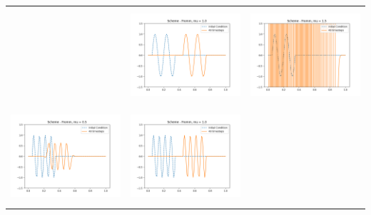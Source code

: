 \documentclass[a4paper,twoside,11pt]{article}
\begin{document}
\begin{table}[!h]
\begin{tabular}{ | c | m{5cm} | m{5cm} | }
\begin{minipage}{.3\textwidth}
            \end{minipage}
            &
            \begin{minipage}{.3\textwidth}
              \includegraphics[width=\linewidth, height=3.5cm]{../plots/scheme6-IC2-mu1_0.png}
            \end{minipage}
            &
            \begin{minipage}{.3\textwidth}
              \includegraphics[width=\linewidth, height=3.5cm]{../plots/scheme6-IC2-mu1_5.png}
            \end{minipage} \\
            \begin{minipage}{.3\textwidth}
              \includegraphics[width=\linewidth, height=3.5cm]{../plots/scheme6-IC3-mu0_5.png}
            \end{minipage}
            &
            \begin{minipage}{.3\textwidth}
              \includegraphics[width=\linewidth, height=3.5cm]{../plots/scheme6-IC3-mu1_0.png}
            \end{minipage}

\end{tabular}
\end{table}
\end{document}
